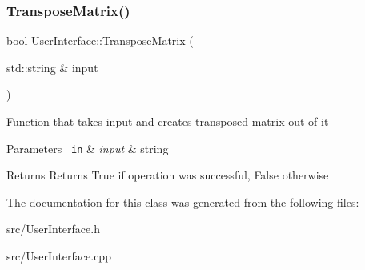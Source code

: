 \subsubsection{\texorpdfstring{TransposeMatrix()}{TransposeMatrix()}}
{\footnotesize\ttfamily bool User\+Interface\+::\+Transpose\+Matrix (\begin{DoxyParamCaption}\item[{std\+::string \&}]{input }\end{DoxyParamCaption})}

Function that takes input and creates transposed matrix out of it 
\begin{DoxyParams}[1]{Parameters}
\mbox{\texttt{ in}}  & {\em input} & string \\
\hline
\end{DoxyParams}
\begin{DoxyReturn}{Returns}
Returns True if operation was successful, False otherwise 
\end{DoxyReturn}


The documentation for this class was generated from the following files\+:\begin{DoxyCompactItemize}
\item 
src/User\+Interface.\+h\item 
src/User\+Interface.\+cpp\end{DoxyCompactItemize}
